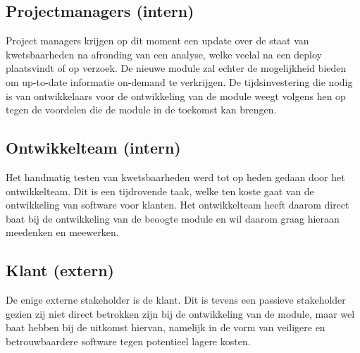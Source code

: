 \subsection{Projectmanagers (intern)}\label{subsec:projectmanagers-(intern)1}
Project managers krijgen op dit moment een update over de staat van kwetsbaarheden na afronding van een analyse, welke veelal na een deploy plaatsvindt of op verzoek. De nieuwe module zal echter de mogelijkheid bieden om up-to-date informatie on-demand te verkrijgen.
De tijdsinvestering die nodig is van ontwikkelaars voor de ontwikkeling van de module weegt volgens hen op tegen de voordelen die de module in de toekomst kan brengen.

\subsection{Ontwikkelteam (intern)}\label{subsec:ontwikkelteam-(intern)1}
Het handmatig testen van kwetsbaarheden werd tot op heden gedaan door het ontwikkelteam. Dit is een tijdrovende taak, welke ten koste gaat van de ontwikkeling van software voor klanten. Het ontwikkelteam heeft daarom direct baat bij de ontwikkeling van de beoogte module en wil daarom graag hieraan meedenken en meewerken.

\subsection{Klant (extern)}\label{subsec:klant-(extern)1}
De enige externe stakeholder is de klant. Dit is tevens een passieve stakeholder gezien zij niet direct betrokken zijn bij de ontwikkeling van de module, maar wel baat hebben bij de uitkomst hiervan, namelijk in de vorm van veiligere en betrouwbaardere software tegen potentieel lagere kosten.

